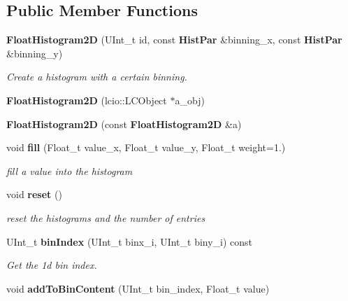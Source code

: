 \subsection*{Public Member Functions}
\begin{DoxyCompactItemize}
\item 
{\bf FloatHistogram2D} (UInt\_\-t id, const {\bf HistPar} \&binning\_\-x, const {\bf HistPar} \&binning\_\-y)
\begin{DoxyCompactList}\small\item\em Create a histogram with a certain binning. \item\end{DoxyCompactList}\item 
{\bfseries FloatHistogram2D} (lcio::LCObject $\ast$a\_\-obj)\label{classhistmgr_1_1FloatHistogram2D_ab0dea4b3d379cdb854036719674e71d4}

\item 
{\bfseries FloatHistogram2D} (const {\bf FloatHistogram2D} \&a)\label{classhistmgr_1_1FloatHistogram2D_a68f0f15e037cb32f3d77d6f0984ee3b4}

\item 
void {\bf fill} (Float\_\-t value\_\-x, Float\_\-t value\_\-y, Float\_\-t weight=1.)\label{classhistmgr_1_1FloatHistogram2D_aa817630a68b7456960a13d984032fce6}

\begin{DoxyCompactList}\small\item\em fill a value into the histogram \item\end{DoxyCompactList}\item 
void {\bf reset} ()\label{classhistmgr_1_1FloatHistogram2D_ad3fdcad04762ab70fa346e23d7190b97}

\begin{DoxyCompactList}\small\item\em reset the histograms and the number of entries \item\end{DoxyCompactList}\item 
UInt\_\-t {\bf binIndex} (UInt\_\-t binx\_\-i, UInt\_\-t biny\_\-i) const \label{classhistmgr_1_1FloatHistogram2D_a220db5ab33a4a99a3c1cef4a20b0906c}

\begin{DoxyCompactList}\small\item\em Get the 1d bin index. \item\end{DoxyCompactList}\item 
void {\bf addToBinContent} (UInt\_\-t bin\_\-index, Float\_\-t value)\label{classhistmgr_1_1FloatHistogram2D_a15daa23f7a152fa7b66aa9615aaa5178}


\end{DoxyCompactItemize}
